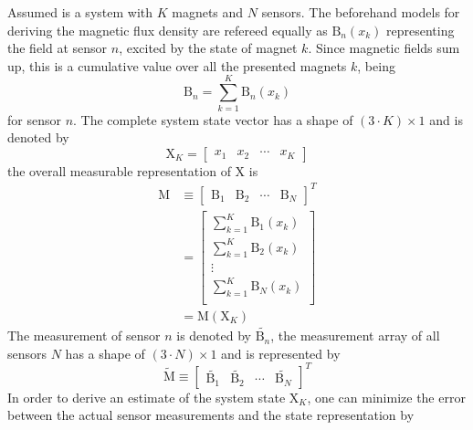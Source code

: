 Assumed is a system with $ K $ magnets and $ N $ sensors. The beforehand models for deriving the magnetic flux density are refereed equally as $ \mathrm{B}_{n}(x_{k}) $ representing the field at sensor $ n $, excited by the state of magnet $ k $. Since magnetic fields sum up, this is a cumulative value over all the presented magnets $ k $, being
\begin{equation}
\mathrm{B}_{n} = \sum_{k=1}^{K} \mathrm{B}_n(x_{k})
\end{equation}
for sensor $ n $. The complete system state vector has a shape of $ (3 \cdot K) \times 1 $ and is denoted by
\begin{equation}
\mathrm{X}_K = \begin{bmatrix} x_{1} & x_{2} & \cdots & x_{K}  \end{bmatrix}
\end{equation} 
the overall measurable  representation of $ \mathrm{X} $ is
\begin{equation}
\begin{aligned}
\mathrm{M} &\equiv \begin{bmatrix} {\mathrm{B}}_{1} & {\mathrm{B}}_{2} & \cdots & {\mathrm{B}}_{N} \end{bmatrix}^{T}\\
		&= \begin{bmatrix}
			\sum_{k=1}^{K} \mathrm{B}_1(x_{k})\\
			\sum_{k=1}^{K} \mathrm{B}_2(x_{k})\\
			\vdots \\
		    \sum_{k=1}^{K} \mathrm{B}_N(x_{k})\\
		\end{bmatrix} \\
	    &= \mathrm{M}(\mathrm{X}_K)
\end{aligned}
\end{equation}
The measurement of sensor $ n $ is denoted by $ \tilde{\mathrm{B}_{n}} $, the measurement array of all sensors $ N $ has a shape of $ (3 \cdot N) \times 1 $ and is represented by 
\begin{equation}
\tilde{\mathrm{M}} \equiv \begin{bmatrix} \tilde{\mathrm{B}_{1}} & \tilde{\mathrm{B}_{2}} & \cdots & \tilde{\mathrm{B}_{N}} \end{bmatrix}^{T}
\end{equation}
In order to derive an estimate of the system state $ \mathrm{X}_K $, one can minimize the error between the actual sensor measurements and the state representation by
